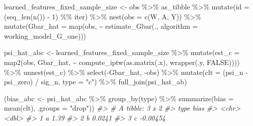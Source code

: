 \documentclass[
  11pt,
  openright,twoside]{book}
\newenvironment{Shaded}{\begin{snugshade}}{\end{snugshade}}
\newcommand{\AttributeTok}[1]{\textcolor[rgb]{0.77,0.63,0.00}{#1}}
\newcommand{\CommentTok}[1]{\textcolor[rgb]{0.56,0.35,0.01}{\textit{#1}}}
\newcommand{\ConstantTok}[1]{\textcolor[rgb]{0.00,0.00,0.00}{#1}}
\newcommand{\DecValTok}[1]{\textcolor[rgb]{0.00,0.00,0.81}{#1}}
\newcommand{\FunctionTok}[1]{\textcolor[rgb]{0.00,0.00,0.00}{#1}}
\newcommand{\NormalTok}[1]{#1}
\newcommand{\OtherTok}[1]{\textcolor[rgb]{0.56,0.35,0.01}{#1}}
\newcommand{\SpecialCharTok}[1]{\textcolor[rgb]{0.00,0.00,0.00}{#1}}
\newcommand{\StringTok}[1]{\textcolor[rgb]{0.31,0.60,0.02}{#1}}
\theoremstyle{definition}
\theoremstyle{definition}
\theoremstyle{definition}
\theoremstyle{definition}
\theoremstyle{remark}
\begin{document}
\begin{Shaded}
\begin{Highlighting}[]
\NormalTok{learned\_features\_fixed\_sample\_size }\OtherTok{\textless{}{-}}
\NormalTok{  obs }\SpecialCharTok{\%\textgreater{}\%}\NormalTok{ as\_tibble }\SpecialCharTok{\%\textgreater{}\%}
  \FunctionTok{mutate}\NormalTok{(}\AttributeTok{id =}\NormalTok{ (}\FunctionTok{seq\_len}\NormalTok{(}\FunctionTok{n}\NormalTok{()) }\SpecialCharTok{{-}} \DecValTok{1}\NormalTok{) }\SpecialCharTok{\%\%}\NormalTok{ iter) }\SpecialCharTok{\%\textgreater{}\%}
  \FunctionTok{nest}\NormalTok{(}\AttributeTok{obs =} \FunctionTok{c}\NormalTok{(W, A, Y)) }\SpecialCharTok{\%\textgreater{}\%}
  \FunctionTok{mutate}\NormalTok{(}\AttributeTok{Gbar\_hat =}
           \FunctionTok{map}\NormalTok{(obs,}
               \SpecialCharTok{\textasciitilde{}} \FunctionTok{estimate\_Gbar}\NormalTok{(., }\AttributeTok{algorithm =}\NormalTok{ working\_model\_G\_one)))}

\NormalTok{psi\_hat\_abc }\OtherTok{\textless{}{-}}
\NormalTok{  learned\_features\_fixed\_sample\_size }\SpecialCharTok{\%\textgreater{}\%}
  \FunctionTok{mutate}\NormalTok{(}\AttributeTok{est\_c =}
           \FunctionTok{map2}\NormalTok{(obs, Gbar\_hat,}
                \SpecialCharTok{\textasciitilde{}} \FunctionTok{compute\_iptw}\NormalTok{(}\FunctionTok{as.matrix}\NormalTok{(.x), }\FunctionTok{wrapper}\NormalTok{(.y, }\ConstantTok{FALSE}\NormalTok{)))) }\SpecialCharTok{\%\textgreater{}\%}
  \FunctionTok{unnest}\NormalTok{(est\_c) }\SpecialCharTok{\%\textgreater{}\%} \FunctionTok{select}\NormalTok{(}\SpecialCharTok{{-}}\NormalTok{Gbar\_hat, }\SpecialCharTok{{-}}\NormalTok{obs) }\SpecialCharTok{\%\textgreater{}\%}
  \FunctionTok{mutate}\NormalTok{(}\AttributeTok{clt =}\NormalTok{ (psi\_n }\SpecialCharTok{{-}}\NormalTok{ psi\_zero) }\SpecialCharTok{/}\NormalTok{ sig\_n,}
         \AttributeTok{type =} \StringTok{"c"}\NormalTok{) }\SpecialCharTok{\%\textgreater{}\%}
  \FunctionTok{full\_join}\NormalTok{(psi\_hat\_ab)}

\NormalTok{(bias\_abc }\OtherTok{\textless{}{-}}\NormalTok{ psi\_hat\_abc }\SpecialCharTok{\%\textgreater{}\%}
   \FunctionTok{group\_by}\NormalTok{(type) }\SpecialCharTok{\%\textgreater{}\%} \FunctionTok{summarize}\NormalTok{(}\AttributeTok{bias =} \FunctionTok{mean}\NormalTok{(clt), }\AttributeTok{.groups =} \StringTok{"drop"}\NormalTok{))}
\CommentTok{\#\textgreater{} \# A tibble: 3 x 2}
\CommentTok{\#\textgreater{}   type      bias}
\CommentTok{\#\textgreater{}   \textless{}chr\textgreater{}    \textless{}dbl\textgreater{}}
\CommentTok{\#\textgreater{} 1 a      1.39   }
\CommentTok{\#\textgreater{} 2 b      0.0241 }
\CommentTok{\#\textgreater{} 3 c     {-}0.00454}
\end{Highlighting}
\end{Shaded}
\end{document}
